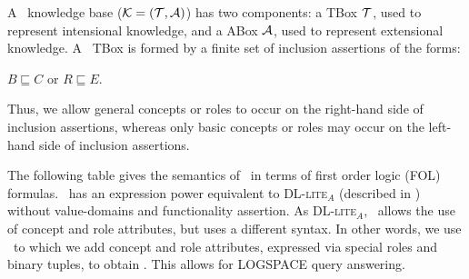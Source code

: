 A \dlm\ knowledge base ($\hbox{${\cal K}$} = (\hbox{${\cal T}$},\hbox{${\cal A}$})$)  has two components: a TBox $\hbox{${\cal T}$}$, used to represent intensional knowledge, and a ABox $\hbox{${\cal A}$}$, used
to represent  extensional knowledge.
A \dlm\ TBox is formed by a finite set of inclusion assertions of the forms:

\centerline{$ B \sqsubseteq C$ or $ R \sqsubseteq E$.}
 
Thus, 
 we allow general concepts or roles to occur on the right-hand side of inclusion assertions, whereas only basic concepts or roles may occur on the left-hand side of inclusion assertions.
 
 The following table gives the semantics of \dlm\ in terms of first order logic (FOL) formulas.
 \dlm\  has an expression power equivalent to \textsc{DL-lite}$_{A}$ (described in \cite{CDLLR06c}) without value-domains and functionality assertion.
As \textsc{DL-lite}$_{A}$, \dlm\ allows the use of concept and role attributes, but uses a different syntax.
 In other words, we use \dlr\ to which we add concept and role attributes, expressed via special roles and binary tuples, to obtain \dlm.
 This allows for  LOGSPACE query answering.


